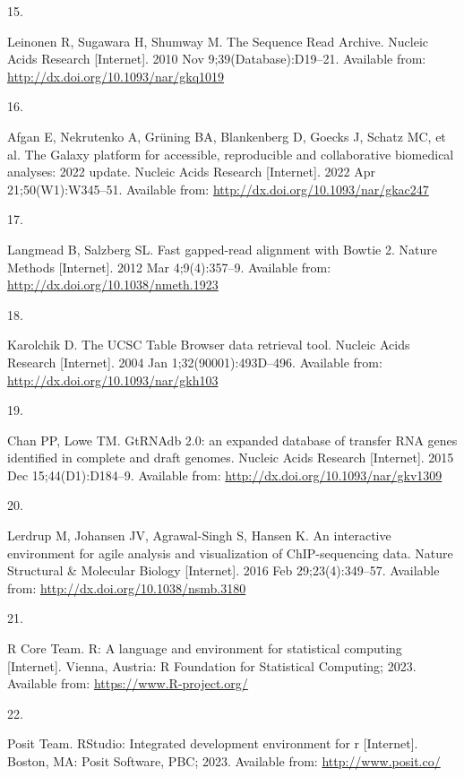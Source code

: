 \documentclass[
  12pt,
]{article}
\newlength{\cslhangindent}
\newlength{\csllabelwidth}
\newlength{\cslentryspacingunit} %
\newenvironment{CSLReferences}[2] %
 {%
  \setlength{\parindent}{0pt}
  \ifodd #1
  \let\oldpar\par
  \def\par{\hangindent=\cslhangindent\oldpar}
  \fi
  \setlength{\parskip}{#2\cslentryspacingunit}
 }%
 {}
\newcommand{\CSLLeftMargin}[1]{\parbox[t]{\csllabelwidth}{#1}}
\newcommand{\CSLRightInline}[1]{\parbox[t]{\linewidth - \csllabelwidth}{#1}\break}
\begin{document}
\begin{CSLReferences}{0}{0}
\leavevmode{}%
\CSLLeftMargin{15. }%
\CSLRightInline{Leinonen R, Sugawara H, Shumway M. The Sequence Read Archive. Nucleic Acids Research {[}Internet{]}. 2010 Nov 9;39(Database):D19--21. Available from: \url{http://dx.doi.org/10.1093/nar/gkq1019}}

\leavevmode{}%
\CSLLeftMargin{16. }%
\CSLRightInline{Afgan E, Nekrutenko A, Grüning BA, Blankenberg D, Goecks J, Schatz MC, et al. The Galaxy platform for accessible, reproducible and collaborative biomedical analyses: 2022 update. Nucleic Acids Research {[}Internet{]}. 2022 Apr 21;50(W1):W345--51. Available from: \url{http://dx.doi.org/10.1093/nar/gkac247}}

\leavevmode{}%
\CSLLeftMargin{17. }%
\CSLRightInline{Langmead B, Salzberg SL. Fast gapped-read alignment with Bowtie 2. Nature Methods {[}Internet{]}. 2012 Mar 4;9(4):357--9. Available from: \url{http://dx.doi.org/10.1038/nmeth.1923}}

\leavevmode{}%
\CSLLeftMargin{18. }%
\CSLRightInline{Karolchik D. The UCSC Table Browser data retrieval tool. Nucleic Acids Research {[}Internet{]}. 2004 Jan 1;32(90001):493D--496. Available from: \url{http://dx.doi.org/10.1093/nar/gkh103}}

\leavevmode{}%
\CSLLeftMargin{19. }%
\CSLRightInline{Chan PP, Lowe TM. GtRNAdb 2.0: an expanded database of transfer RNA genes identified in complete and draft genomes. Nucleic Acids Research {[}Internet{]}. 2015 Dec 15;44(D1):D184--9. Available from: \url{http://dx.doi.org/10.1093/nar/gkv1309}}

\leavevmode{}%
\CSLLeftMargin{20. }%
\CSLRightInline{Lerdrup M, Johansen JV, Agrawal-Singh S, Hansen K. An interactive environment for agile analysis and visualization of ChIP-sequencing data. Nature Structural \& Molecular Biology {[}Internet{]}. 2016 Feb 29;23(4):349--57. Available from: \url{http://dx.doi.org/10.1038/nsmb.3180}}

\leavevmode{}%
\CSLLeftMargin{21. }%
\CSLRightInline{R Core Team. R: A language and environment for statistical computing {[}Internet{]}. Vienna, Austria: R Foundation for Statistical Computing; 2023. Available from: \url{https://www.R-project.org/}}

\leavevmode{}%
\CSLLeftMargin{22. }%
\CSLRightInline{Posit Team. RStudio: Integrated development environment for r {[}Internet{]}. Boston, MA: Posit Software, PBC; 2023. Available from: \url{http://www.posit.co/}}


\end{CSLReferences}
\end{document}

